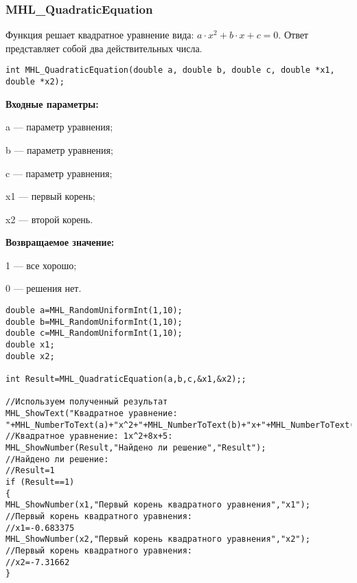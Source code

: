 \documentclass[a4paper,12pt]{article}
\begin{document}
\subsubsection{MHL\_QuadraticEquation}\label{MHL_QuadraticEquation}

Функция решает квадратное уравнение вида: $a\cdot x^2+b\cdot x+c=0$. Ответ представляет собой два действительных числа.


\begin{lstlisting}[label=code_syntax_MHL_QuadraticEquation,caption=Синтаксис]
int MHL_QuadraticEquation(double a, double b, double c, double *x1, double *x2);
\end{lstlisting}

\textbf{Входные параметры:}
 
a --- параметр уравнения;
 
b --- параметр уравнения;
 
c --- параметр уравнения;
 
x1 --- первый корень;
 
x2 --- второй корень.

\textbf{Возвращаемое значение:}
 
1 --- все хорошо;
 
0 --- решения нет.



\begin{lstlisting}[label=code_use_MHL_QuadraticEquation,caption=Пример использования]
double a=MHL_RandomUniformInt(1,10);
double b=MHL_RandomUniformInt(1,10);
double c=MHL_RandomUniformInt(1,10);
double x1;
double x2;

int Result=MHL_QuadraticEquation(a,b,c,&x1,&x2);;

//Используем полученный результат
MHL_ShowText("Квадратное уравнение: "+MHL_NumberToText(a)+"x^2+"+MHL_NumberToText(b)+"x+"+MHL_NumberToText(c)+"=0");
//Квадратное уравнение: 1x^2+8x+5:
MHL_ShowNumber(Result,"Найдено ли решение","Result");
//Найдено ли решение:
//Result=1
if (Result==1)
{
MHL_ShowNumber(x1,"Первый корень квадратного уравнения","x1");
//Первый корень квадратного уравнения:
//x1=-0.683375
MHL_ShowNumber(x2,"Первый корень квадратного уравнения","x2");
//Первый корень квадратного уравнения:
//x2=-7.31662
}
\end{lstlisting}

\newpage
\end{document}

